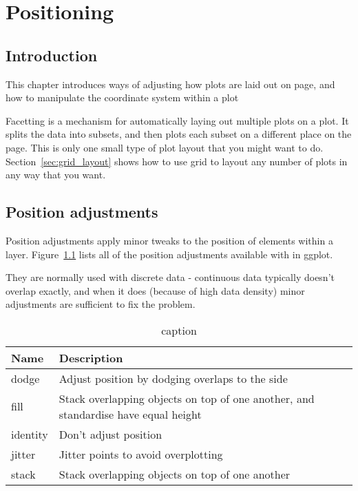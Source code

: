 
\chapter{Positioning}
\label{cha:position}

\section{Introduction}

This chapter introduces ways of adjusting how plots are laid out on page, and  how to manipulate the coordinate system within a plot

Facetting is a mechanism for automatically laying out multiple plots on a plot.  It splits the data into subsets, and then plots each subset on a different place on the page.  This is only one small type of plot layout that you might want to do.  Section~\ref{sec:grid_layout} shows how to use grid to layout any number of plots in any way that you want.

\section{Position adjustments}
\label{sec:position}

Position adjustments apply minor tweaks to the position of elements within a layer.  Figure~\ref{fig:position} lists all of the position adjustments available with in ggplot.  

They are normally used with discrete data - continuous data typically doesn't overlap exactly, and when it does (because of high data density) minor adjustments are sufficient to fix the problem.

\begin{table}
  \begin{center}
  \begin{tabular}{ll}
    \toprule
    Name      & Description  \\
    \midrule
    dodge    & Adjust position by dodging overlaps to the side \\
    fill     & Stack overlapping objects on top of one another, and standardise have equal height\\
    identity & Don't adjust position \\
    jitter   & Jitter points to avoid overplotting \\
    stack    & Stack overlapping objects on top of one another \\
    \bottomrule
  \end{tabular}
  \end{center}
  \caption{caption}
  \label{fig:position}
\end{table}

